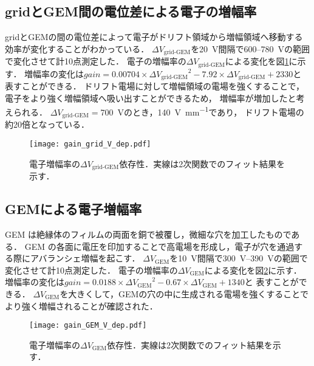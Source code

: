 \documentclass[../master]{subfiles}
\begin{document}
\subsection{gridとGEM間の電位差による電子の増幅率}
gridとGEMの間の電位差によって電子がドリフト領域から増幅領域へ移動する効率が変化することがわかっている．%
$\Delta V_{\text{grid-GEM}}$を\SI{20}{\volt}間隔で\SI{600}{}--\SI{780}{\volt}の範囲で変化させて計10点測定した．
電子の増幅率の$\Delta V_{\text{grid-GEM}}$による変化を図\ref{fig::gain_grid_GEM_V_dep}に示す．
増幅率の変化は$\mathit{gain} = 0.00704\times{\Delta V_{\text{grid-GEM}}}^2-7.92\times{\Delta V_{\text{grid-GEM}}}+2330$と
表すことができる．
ドリフト電場に対して増幅領域の電場を強くすることで，電子をより強く増幅領域へ吸い出すことができるため，
増幅率が増加したと考えられる．
$\Delta V_{\text{grid-GEM}} = $\SI{700}{\volt}のとき，\SI{140}{\volt\per\milli\metre}であり，
ドリフト電場の約20倍となっている．
\begin{figure}
  \centering
  \texttt{[image: gain\_grid\_V\_dep.pdf]} 
  \caption{電子増幅率の$\Delta V_{\text{grid-GEM}}$依存性．実線は2次関数でのフィット結果を示す．}
  \label{fig::gain_grid_GEM_V_dep}
\end{figure}

\subsection{GEMによる電子増幅率}
GEM は絶縁体のフィルムの両面を銅で被覆し，微細な穴を加工したものである．
GEM の各面に電圧を印加することで高電場を形成し，電子が穴を通過する際にアバランシェ増幅を起こす．
$\Delta V_{\text{GEM}}$を\SI{10}{\volt}間隔で\SIrange{300}{390}{\volt}の範囲で変化させて計10点測定した．
電子の増幅率の$\Delta V_{\text{GEM}}$による変化を図\ref{fig::gain_GEM_V_dep}に示す．
増幅率の変化は$\mathit{gain} = 0.0188\times{\Delta V_{\text{GEM}}}^2-0.67\times{\Delta V_{\text{GEM}}}+1340$と
表すことができる．
$\Delta V_{\text{GEM}}$を大きくして，GEMの穴の中に生成される電場を強くすることでより強く増幅されることが確認された．
\begin{figure}
  \centering
  \texttt{[image: gain\_GEM\_V\_dep.pdf]}
  \caption{電子増幅率の$\Delta V_{\text{GEM}}$依存性．実線は2次関数でのフィット結果を示す．}
  \label{fig::gain_GEM_V_dep}
\end{figure}
\end{document}

